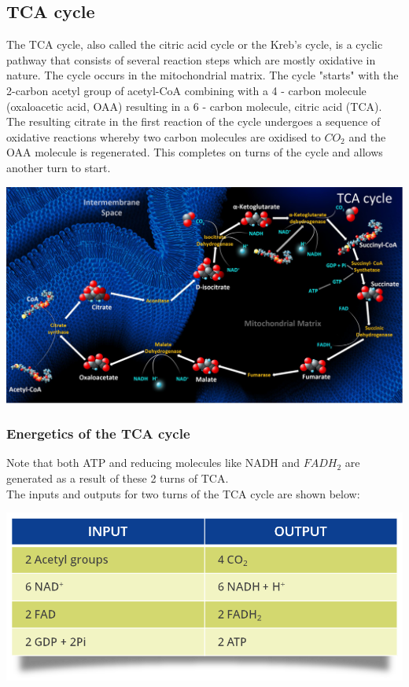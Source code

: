 \documentclass[11pt]{article}
\begin{document}
\newpage

\subsection{TCA cycle}
\label{sec:org0cec090}
The TCA cycle, also called the citric acid cycle or the Kreb's cycle, is a cyclic pathway that consists of several reaction steps which are mostly oxidative in nature. The cycle occurs in the mitochondrial matrix. The cycle "starts" with the 2-carbon acetyl group of acetyl-CoA combining with a 4 - carbon molecule (oxaloacetic acid, OAA) resulting in a 6 - carbon molecule, citric acid (TCA). The resulting citrate in the first reaction of the cycle undergoes a sequence of oxidative reactions whereby two carbon molecules are oxidised to \(CO_2\) and the OAA molecule is regenerated. This completes on turns of the cycle and allows another turn to start.
\begin{center}
\includegraphics[width=.9\linewidth]{./images/tca-cycle.png}
\end{center}

\subsubsection{Energetics of the TCA cycle}
\label{sec:org4b93d98}
Note that both ATP and reducing molecules like NADH and \(FADH_2\) are generated as a result of these 2 turns of TCA.
\\[0pt]

The inputs and outputs for two turns of the TCA cycle are shown below:
\begin{center}
\includegraphics[scale=0.3]{./images/tca-inputs-and-outputs.png}
\end{center}
\end{document}

